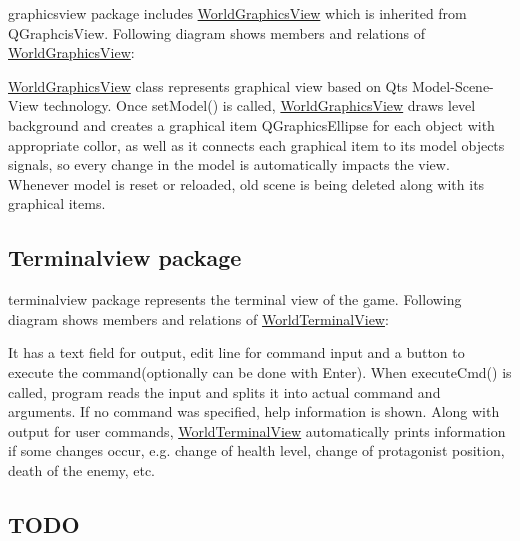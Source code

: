 {\ttfamily graphicsview} package includes {\ttfamily \hyperlink{classWorldGraphicsView}{World\+Graphics\+View}} which is inherited from {\ttfamily Q\+Graphcis\+View}. Following diagram shows members and relations of {\ttfamily \hyperlink{classWorldGraphicsView}{World\+Graphics\+View}}\+:



{\ttfamily \hyperlink{classWorldGraphicsView}{World\+Graphics\+View}} class represents graphical view based on Qt\textquotesingle{}s Model-\/\+Scene-\/\+View technology. Once {\ttfamily set\+Model()} is called, {\ttfamily \hyperlink{classWorldGraphicsView}{World\+Graphics\+View}} draws level background and creates a graphical item {\ttfamily Q\+Graphics\+Ellipse} for each object with appropriate collor, as well as it connects each graphical item to its model object\textquotesingle{}s signals, so every change in the model is automatically impacts the view. Whenever model is reset or reloaded, old scene is being deleted along with its graphical items.

\subsection*{Terminalview package}

{\ttfamily terminalview} package represents the terminal view of the game. Following diagram shows members and relations of {\ttfamily \hyperlink{classWorldTerminalView}{World\+Terminal\+View}}\+:



It has a text field for output, edit line for command input and a button to execute the command(optionally can be done with {\ttfamily Enter}). When {\ttfamily execute\+Cmd()} is called, program reads the input and splits it into actual command and arguments. If no command was specified, help information is shown. Along with output for user commands, {\ttfamily \hyperlink{classWorldTerminalView}{World\+Terminal\+View}} automatically prints information if some changes occur, e.\+g. change of health level, change of protagonist position, death of the enemy, etc.

\subsection*{T\+O\+DO}


